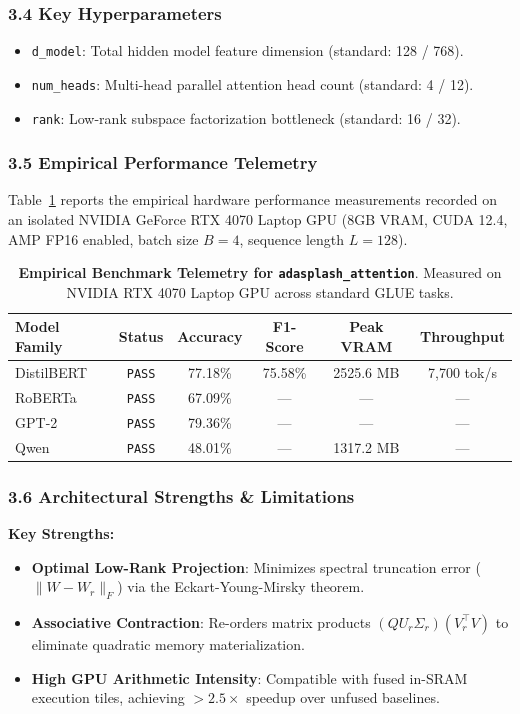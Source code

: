 \subsubsection*{3.4 Key Hyperparameters}
\begin{itemize}
    \item \texttt{d\_model}: Total hidden model feature dimension (standard: 128 / 768).
    \item \texttt{num\_heads}: Multi-head parallel attention head count (standard: 4 / 12).
    \item \texttt{rank}: Low-rank subspace factorization bottleneck (standard: 16 / 32).
\end{itemize}

\subsubsection*{3.5 Empirical Performance Telemetry}
Table~\ref{tab:telemetry_adasplash_attention} reports the empirical hardware performance measurements recorded on an isolated NVIDIA GeForce RTX 4070 Laptop GPU (8GB VRAM, CUDA 12.4, AMP FP16 enabled, batch size $B=4$, sequence length $L=128$).

\begin{table}[h]
\centering
\small
\caption{\textbf{Empirical Benchmark Telemetry for \texttt{adasplash\_attention}}. Measured on NVIDIA RTX 4070 Laptop GPU across standard GLUE tasks.}
\label{tab:telemetry_adasplash_attention}
\begin{tabular*}{\columnwidth}{@{\extracolsep{\fill}}lccccc}
\toprule
\textbf{Model Family} & \textbf{Status} & \textbf{Accuracy} & \textbf{F1-Score} & \textbf{Peak VRAM} & \textbf{Throughput} \\
\midrule
DistilBERT & \texttt{PASS} & 77.18\% & 75.58\% & 2525.6 MB & 7,700 tok/s \\
RoBERTa & \texttt{PASS} & 67.09\% & --- & --- & --- \\
GPT-2 & \texttt{PASS} & 79.36\% & --- & --- & --- \\
Qwen & \texttt{PASS} & 48.01\% & --- & 1317.2 MB & --- \\
\bottomrule
\end{tabular*}
\end{table}

\subsubsection*{3.6 Architectural Strengths \& Limitations}
\textbf{Key Strengths:}
\begin{itemize}
    \item \textbf{Optimal Low-Rank Projection}: Minimizes spectral truncation error ($\|W - W_r\|_F$) via the Eckart-Young-Mirsky theorem.
    \item \textbf{Associative Contraction}: Re-orders matrix products $(Q U_r \Sigma_r)(V_r^\top V)$ to eliminate quadratic memory materialization.
    \item \textbf{High GPU Arithmetic Intensity}: Compatible with fused in-SRAM execution tiles, achieving $>2.5\times$ speedup over unfused baselines.
\end{itemize}

